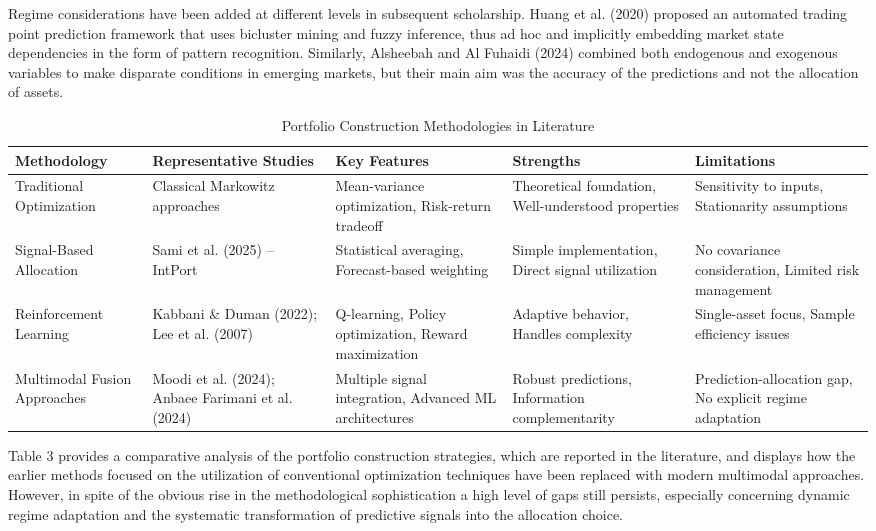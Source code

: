 \documentclass{singlecol-new}
\theoremstyle{TH}{
\newtheorem{lemma}{Lemma}
\newtheorem{theorem}[lemma]{Theorem}
\newtheorem{corrolary}[lemma]{Corrolary}
\newtheorem{conjecture}[lemma]{Conjecture}
\newtheorem{proposition}[lemma]{Proposition}
\newtheorem{claim}[lemma]{Claim}
\newtheorem{stheorem}[lemma]{Wrong Theorem}
\newtheorem{algorithm}{Algorithm}
}
\theoremstyle{THrm}{
\newtheorem{definition}{Definition}[section]
\newtheorem{question}{Question}[section]
\newtheorem{remark}{Remark}
\newtheorem{scheme}{Scheme}
}
\theoremstyle{THhit}{
\newtheorem{case}{Case}[section]
}
\begin{document}
Regime considerations have been added at different levels in subsequent scholarship. Huang et al. (2020) proposed an automated trading point prediction framework that uses bicluster mining and fuzzy inference, thus ad hoc and implicitly embedding market state dependencies in the form of pattern recognition. Similarly, Alsheebah and Al Fuhaidi (2024) combined both endogenous and exogenous variables to make disparate conditions in emerging markets, but their main aim was the accuracy of the predictions and not the allocation of assets.



\begin{table}[!ht]
\centering
\caption{Portfolio Construction Methodologies in Literature}
\label{tab:portfolio_methodologies}
\small
\begin{tabular}{p{2cm}p{2cm}p{2cm}p{2cm}p{2cm}}
\hline
\textbf{Methodology} & \textbf{Representative Studies} & \textbf{Key Features} & \textbf{Strengths} & \textbf{Limitations} \\
\hline
Traditional Optimization & Classical Markowitz approaches & Mean-variance optimization, Risk-return tradeoff & Theoretical foundation, Well-understood properties & Sensitivity to inputs, Stationarity assumptions \\
\hline
Signal-Based Allocation & Sami et al. (2025) -- IntPort & Statistical averaging, Forecast-based weighting & Simple implementation, Direct signal utilization & No covariance consideration, Limited risk management \\
\hline
Reinforcement Learning & Kabbani \& Duman (2022); Lee et al. (2007) & Q-learning, Policy optimization, Reward maximization & Adaptive behavior, Handles complexity & Single-asset focus, Sample efficiency issues \\
\hline
Multimodal Fusion Approaches & Moodi et al. (2024); Anbaee Farimani et al. (2024) & Multiple signal integration, Advanced ML architectures & Robust predictions, Information complementarity & Prediction-allocation gap, No explicit regime adaptation \\
\hline
\end{tabular}
\end{table}

Table 3 provides a comparative analysis of the portfolio construction strategies, which are reported in the literature, and displays how the earlier methods focused on the utilization of conventional optimization techniques have been replaced with modern multimodal approaches. However, in spite of the obvious rise in the methodological sophistication a high level of gaps still persists, especially concerning dynamic regime adaptation and the systematic transformation of predictive signals into the allocation choice.
\end{document}
